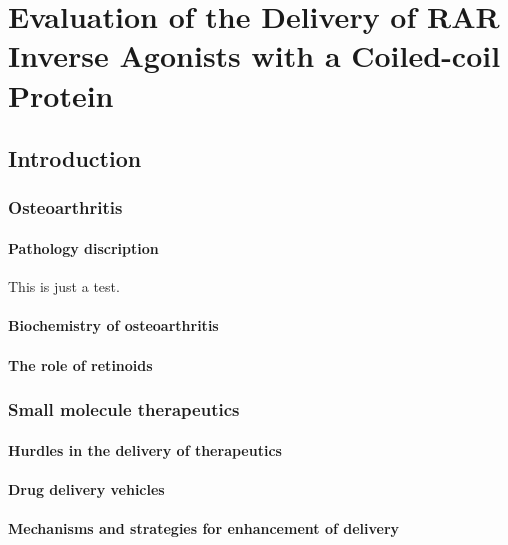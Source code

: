 \chapter{Evaluation of the Delivery of RAR Inverse Agonists with a Coiled-coil
Protein}

\begin{refsection}

\section{Introduction}

\subsection{Osteoarthritis}

\subsubsection{Pathology discription}

This is just a test.\cite{Rabotyagova2011,Kwon2003}

\subsubsection{Biochemistry of osteoarthritis}

\subsubsection{The role of retinoids}

\subsection{Small molecule therapeutics}

\subsubsection{Hurdles in the delivery of therapeutics}

\subsubsection{Drug delivery vehicles}

\subsubsection{Mechanisms and strategies for enhancement of delivery}


\end{refsection}
